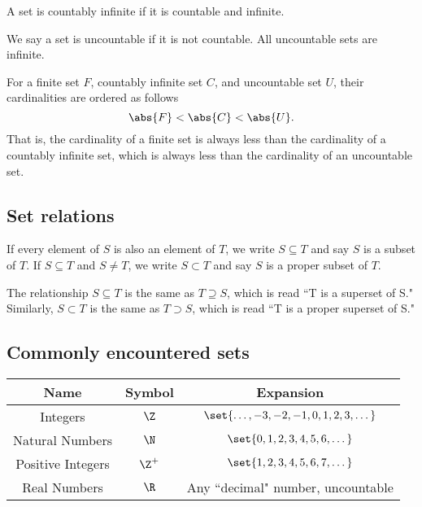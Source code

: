 \documentclass[12pt,paper=letter]{scrartcl}
\begin{document}
    \begin{defboxed}
        A set is countably infinite if it is countable and infinite.
    \end{defboxed}

    \begin{defboxed}
        We say a set is uncountable if it is not countable.
        All uncountable sets are infinite.
    \end{defboxed}

    \begin{defboxed}
        For a finite set $F$,
        countably infinite set $C$,
        and uncountable set $U$,
        their cardinalities are ordered as follows
        \[
            \abs{F}<\abs{C}<\abs{U}.
        \]
        That is,
        the cardinality of a finite set is always less than the cardinality of a countably infinite set,
        which is always less than the cardinality of an uncountable set.
    \end{defboxed}

    \subsection{Set relations}

    \begin{defboxed}
        If every element of $S$ is also an element of $T$,
        we write $S\subseteq T$ and say $S$ is a subset of $T$.
        If $S\subseteq T$ and $S\ne T$,
        we write $S\subset T$ and say $S$ is a proper subset of $T$.
    \end{defboxed}
    \begin{defboxed}
        The relationship $S\subseteq T$ is the same as $T\supseteq S$,
        which is read ``T is a superset of S."
        Similarly, $S\subset T$ is the same as $T\supset S$,
        which is read ``T is a proper superset of S."
    \end{defboxed}

    \subsection{Commonly encountered sets}

    \begin{tabular}{|c|c|c|}
        \hline
        Name & Symbol & Expansion\\
        \hline
        Integers & $\Z$ & $\set{\dots, -3, -2, -1, 0, 1, 2, 3, \dots}$\\
        Natural Numbers & $\N$ & $\set{0, 1, 2, 3, 4, 5, 6, \dots}$\\
        Positive Integers & $\Z^+$ & $\set{1, 2, 3, 4, 5, 6, 7, \dots}$\\
        Real Numbers & $\R$ & Any ``decimal" number, uncountable\\
        \hline
    \end{tabular}
\end{document}
